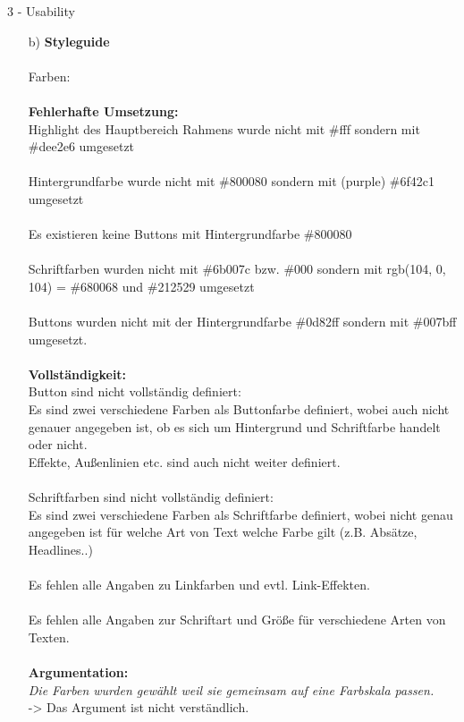 \documentclass[a4paper]{article}
\begin{document}
\begin{exercise}{3 - Usability}
\begin{itemize}
\item[b)]\textbf{Styleguide}\\\\
{\Large Farben:}\\\\
\textbf{Fehlerhafte Umsetzung:}\\
Highlight des Hauptbereich Rahmens wurde nicht mit \#fff sondern mit \#dee2e6 umgesetzt\\\\
Hintergrundfarbe wurde nicht mit \#800080 sondern mit (purple) \#6f42c1 umgesetzt\\\\
Es existieren keine Buttons mit Hintergrundfarbe \#800080 \\\\
Schriftfarben wurden nicht mit \#6b007c bzw. \#000 sondern mit rgb(104, 0, 104) = \#680068 und \#212529 umgesetzt\\\\
Buttons wurden nicht mit der Hintergrundfarbe \#0d82ff sondern mit \#007bff umgesetzt.\\\\
\textbf{Vollständigkeit:}\\
Button sind nicht vollständig definiert:\\
Es sind zwei verschiedene Farben als Buttonfarbe definiert, wobei auch nicht genauer angegeben ist, ob es sich um Hintergrund und Schriftfarbe handelt oder nicht.\\
Effekte, Außenlinien etc. sind auch nicht weiter definiert.\\\\
Schriftfarben sind nicht vollständig definiert:\\
Es sind zwei verschiedene Farben als Schriftfarbe definiert, wobei nicht genau angegeben ist für welche Art von Text welche Farbe gilt (z.B. Absätze, Headlines..)\\\\
Es fehlen alle Angaben zu Linkfarben und evtl. Link-Effekten.\\\\
Es fehlen alle Angaben zur Schriftart und Größe für verschiedene Arten von Texten.\\\\
\textbf{Argumentation:}\\
\textit{Die Farben wurden gewählt weil sie gemeinsam auf eine Farbskala passen.}\\
-> Das Argument ist nicht verständlich.\\\\

\end{itemize}
\end{exercise}
\end{document}
